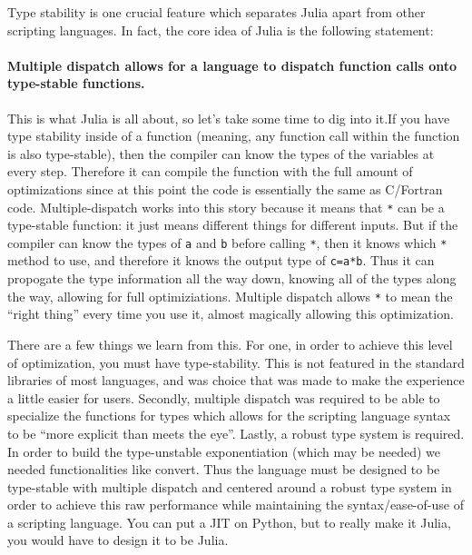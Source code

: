 \documentclass[11pt]{article}
\begin{document}
Type stability is one crucial feature which separates Julia apart from
other scripting languages. In fact, the core idea of Julia is the
following statement:

\paragraph{Multiple dispatch allows for a language to dispatch function
calls onto type-stable
functions.}\label{multiple-dispatch-allows-for-a-language-to-dispatch-function-calls-onto-type-stable-functions.}

This is what Julia is all about, so let's take some time to dig into
it.If you have type stability inside of a function (meaning, any
function call within the function is also type-stable), then the
compiler can know the types of the variables at every step. Therefore it
can compile the function with the full amount of optimizations since at
this point the code is essentially the same as C/Fortran code.
Multiple-dispatch works into this story because it means that \texttt{*}
can be a type-stable function: it just means different things for
different inputs. But if the compiler can know the types of \texttt{a}
and \texttt{b} before calling \texttt{*}, then it knows which \texttt{*}
method to use, and therefore it knows the output type of \texttt{c=a*b}.
Thus it can propogate the type information all the way down, knowing all
of the types along the way, allowing for full optimiziations. Multiple
dispatch allows \texttt{*} to mean the ``right thing'' every time you
use it, almost magically allowing this optimization.

There are a few things we learn from this. For one, in order to achieve
this level of optimization, you must have type-stability. This is not
featured in the standard libraries of most languages, and was choice
that was made to make the experience a little easier for users.
Secondly, multiple dispatch was required to be able to specialize the
functions for types which allows for the scripting language syntax to be
``more explicit than meets the eye''. Lastly, a robust type system is
required. In order to build the type-unstable exponentiation (which may
be needed) we needed functionalities like convert. Thus the language
must be designed to be type-stable with multiple dispatch and centered
around a robust type system in order to achieve this raw performance
while maintaining the syntax/ease-of-use of a scripting language. You
can put a JIT on Python, but to really make it Julia, you would have to
design it to be Julia.
\end{document}
